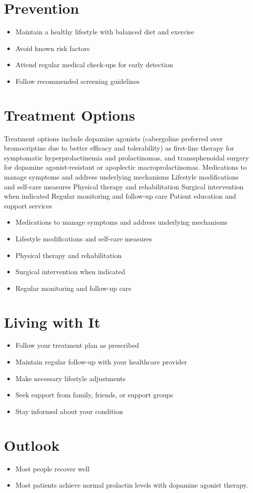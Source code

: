 \section{Prevention}
\begin{itemize}[noitemsep]
  \item Maintain a healthy lifestyle with balanced diet and exercise
  \item Avoid known risk factors
  \item Attend regular medical check-ups for early detection
  \item Follow recommended screening guidelines
\end{itemize}
\section{Treatment Options}
Treatment options include dopamine agonists (cabergoline preferred over bromocriptine due to better efficacy and tolerability) as first-line therapy for symptomatic hyperprolactinemia and prolactinomas, and transsphenoidal surgery for dopamine agonist-resistant or apoplectic macroprolactinomas. Medications to manage symptoms and address underlying mechanisms Lifestyle modifications and self-care measures Physical therapy and rehabilitation Surgical intervention when indicated Regular monitoring and follow-up care Patient education and support services

\begin{itemize}[noitemsep]
  \item Medications to manage symptoms and address underlying mechanisms
  \item Lifestyle modifications and self-care measures
  \item Physical therapy and rehabilitation
  \item Surgical intervention when indicated
  \item Regular monitoring and follow-up care
\end{itemize}
\section{Living with It}
\begin{itemize}[noitemsep]
  \item Follow your treatment plan as prescribed
  \item Maintain regular follow-up with your healthcare provider
  \item Make necessary lifestyle adjustments
  \item Seek support from family, friends, or support groups
  \item Stay informed about your condition
\end{itemize}
\section{Outlook}
\begin{itemize}[noitemsep]
  \item Most people recover well
  \item Most patients achieve normal prolactin levels with dopamine agonist therapy.
\end{itemize}
